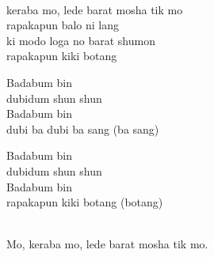 \begin{lyrics}
\\
keraba mo, lede barat mosha tik mo\\
rapakapun balo ni lang\\
ki modo loga no barat shumon\\
rapakapun kiki botang

Badabum bin\\
dubidum shun shun\\
Badabum bin\\
dubi ba dubi ba sang (ba sang)

Badabum bin\\
dubidum shun shun\\
Badabum bin\\
rapakapun kiki botang (botang)


\\
Mo, keraba mo, lede barat mosha tik mo.

\end{lyrics}

